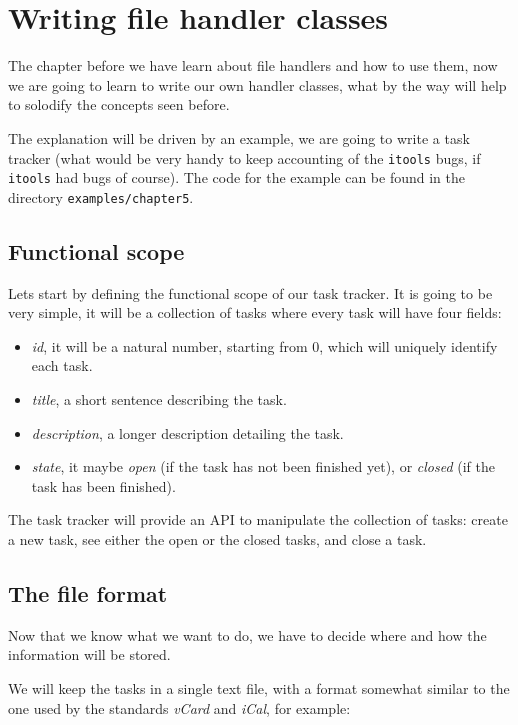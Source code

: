 \chapter{Writing file handler classes}

The chapter before we have learn about file handlers and how to use them,
now we are going to learn to write our own handler classes, what by the
way will help to solodify the concepts seen before.

The explanation will be driven by an example, we are going to write a task
tracker (what would be very handy to keep accounting of the {\tt itools}
bugs, if {\tt itools} had bugs of course). The code for the example can
be found in the directory {\tt examples/chapter5}.

\section{Functional scope}

Lets start by defining the functional scope of our task tracker. It is
going to be very simple, it will be a collection of tasks where every
task will have four fields:

\begin{itemize}
  \item {\em id}, it will be a natural number, starting from 0, which
    will uniquely identify each task.

  \item {\em title}, a short sentence describing the task.

  \item {\em description}, a longer description detailing the task.

  \item {\em state}, it maybe {\em open} (if the task has not been
    finished yet), or {\em closed} (if the task has been finished).
\end{itemize}

The task tracker will provide an API to manipulate the collection of
tasks: create a new task, see either the open or the closed tasks,
and close a task.


\section{The file format}

Now that we know what we want to do, we have to decide where and how
the information will be stored.

We will keep the tasks in a single text file, with a format somewhat
similar to the one used by the standards {\em vCard} and {\em iCal},
for example:

